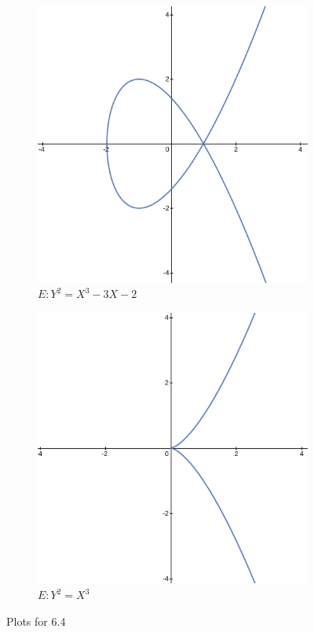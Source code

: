 \documentclass{article}
\begin{document}
\begin{figure}[h!]
\hfil
\begin{subfigure}[h]{0.3\linewidth}
  \includegraphics[width=\linewidth]{img/hw_12_4.png}
  \caption{$E: Y^2 = X^3 - 3X - 2$}
\end{subfigure}
\hfil
\begin{subfigure}[h]{0.3\linewidth}
  \includegraphics[width=\linewidth]{img/hw_12_5.png}
  \caption{$E: Y^2 = X^3$}
\end{subfigure}
\caption{Plots for 6.4}
\label{fig:fig1}
\end{figure}
\end{document}
